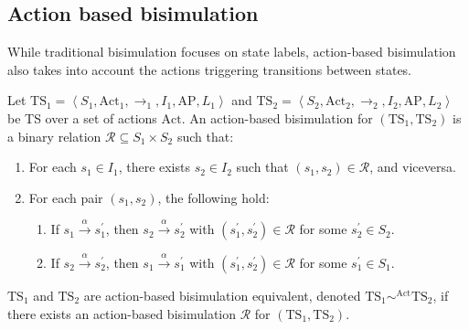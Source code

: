 \subsection{Action based bisimulation}
While traditional bisimulation focuses on state labels, action-based bisimulation also takes into account the actions triggering transitions between states.
\begin{definition}
    Let $\text{TS}_1=\left\langle S_1,\text{Act}_1,\rightarrow_1,I_1,\text{AP},L_1\right\rangle$ and $\text{TS}_2=\left\langle S_2,\text{Act}_2,\rightarrow_2,I_2,\text{AP},L_2\right\rangle$ be TS over a set of actions $\text{Act}$.
    An action-based bisimulation for $(\text{TS}_1,\text{TS}_2)$ is a binary relation $\mathcal{R}\subseteq S_1\times S_2$ such that: 
    \begin{enumerate}
        \item For each $s_1\in I_1$, there exists $s_2\in I_2$ such that $(s_1,s_2)\in\mathcal{R}$, and viceversa.
        \item For each pair $(s_1,s_2)$, the following hold:
            \begin{enumerate}
                \item If $s_1\xrightarrow{\alpha}s_1^\prime$, then $s_2\xrightarrow{\alpha}s_2^\prime$ with $(s_1^\prime,s_2^\prime)\in\mathcal{R}$ for some $s_2^\prime\in S_2$.
                \item If $s_2\xrightarrow{\alpha}s_2^\prime$, then $s_1\xrightarrow{\alpha}s_1^\prime$ with $(s_1^\prime,s_2^\prime)\in\mathcal{R}$ for some $s_1^\prime\in S_1$.
            \end{enumerate}
    \end{enumerate}
    $\text{TS}_1$ and $\text{TS}_2$ are action-based bisimulation equivalent, denoted $\text{TS}_1\sim^{\text{Act}}\text{TS}_2$, if there exists an action-based bisimulation $\mathcal{R}$ for $(\text{TS}_1,\text{TS}_2)$.
\end{definition}